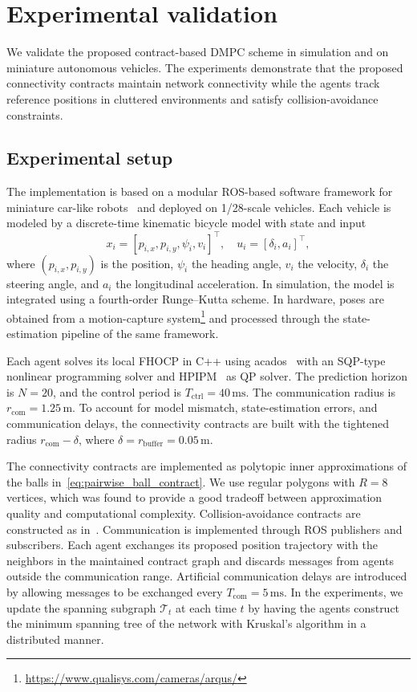 \documentclass[letterpaper, 10 pt, conference]{ieeeconf}  %
\begin{document}
\section{Experimental validation}
\label{sec:experiments}

We validate the proposed contract-based DMPC scheme in simulation and on miniature autonomous vehicles. The experiments demonstrate that the proposed connectivity contracts maintain network connectivity while the agents track reference positions in cluttered environments and satisfy collision-avoidance constraints.

\subsection{Experimental setup}

The implementation is based on a modular ROS-based software framework for miniature car-like robots~\cite{carron2023chronos} and deployed on 1/28-scale vehicles. Each vehicle is modeled by a discrete-time kinematic bicycle model with state and input
\begin{equation*}
	x_i=[p_{i,x},p_{i,y},\psi_i,v_i]^\top,\quad
	u_i=[\delta_i,a_i]^\top,
\end{equation*}
where $(p_{i,x},p_{i,y})$ is the position, $\psi_i$ the heading angle, $v_i$ the velocity, $\delta_i$ the steering angle, and $a_i$ the longitudinal acceleration. In simulation, the model is integrated using a fourth-order Runge--Kutta scheme. In hardware, poses are obtained from a motion-capture system\footnote[1]{\url{https://www.qualisys.com/cameras/arqus/}} and processed through the state-estimation pipeline of the same framework.

Each agent solves its local FHOCP in C++ using acados~\cite{verschueren2022acados} with an SQP-type nonlinear programming solver and HPIPM~\cite{frison2020hpipm} as QP solver. The prediction horizon is $N=20$, and the control period is $T_{\mathrm{ctrl}}=40\,\mathrm{ms}$.
The communication radius is $r_{\mathrm{com}}=1.25\,\mathrm{m}$. To account for model mismatch, state-estimation errors, and communication delays, the connectivity contracts are built with the tightened radius $r_{\mathrm{com}}-\delta$, where $\delta=r_{\mathrm{buffer}}=0.05\,\mathrm{m}$.

The connectivity contracts are implemented as polytopic inner approximations of the balls in~\eqref{eq:pairwise_ball_contract}. We use regular polygons with $R=8$ vertices, which was found to provide a good tradeoff between approximation quality and computational complexity. Collision-avoidance contracts are constructed as in~\cite{bodmer2026anytime}. Communication is implemented through ROS publishers and subscribers. Each agent exchanges its proposed position trajectory with the neighbors in the maintained contract graph and discards messages from agents outside the communication range. Artificial communication delays are introduced by allowing messages to be exchanged every $T_{\mathrm{com}}=5\,\mathrm{ms}$.
In the experiments, we update the spanning subgraph $\mathcal{T}_t$ at each time $t$ by having the agents construct the minimum spanning tree of the network with Kruskal's algorithm in a distributed manner.
\end{document}
